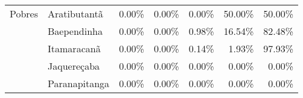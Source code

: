 \begin{table}[h]
\begin{tabular}{ll rrrrr}
\midrule                                                                                                                           
     Pobres        & Aratibutantã         &               0.00\% &         0.00\% &        0.00\% &      50.00\% &            50.00\% \\ 
                & Baependinha             &               0.00\% &         0.00\% &        0.98\% &      16.54\% &            82.48\% \\ 
                & Itamaracanã             &               0.00\% &         0.00\% &        0.14\% &       1.93\% &            97.93\% \\ 
                & Jaquereçaba             &               0.00\% &         0.00\% &        0.00\% &       0.00\% &             0.00\% \\ 
                & Paranapitanga           &               0.00\% &         0.00\% &        0.00\% &       0.00\% &             0.00\% \\ 
\bottomrule
\end{tabular}
\end{table}

